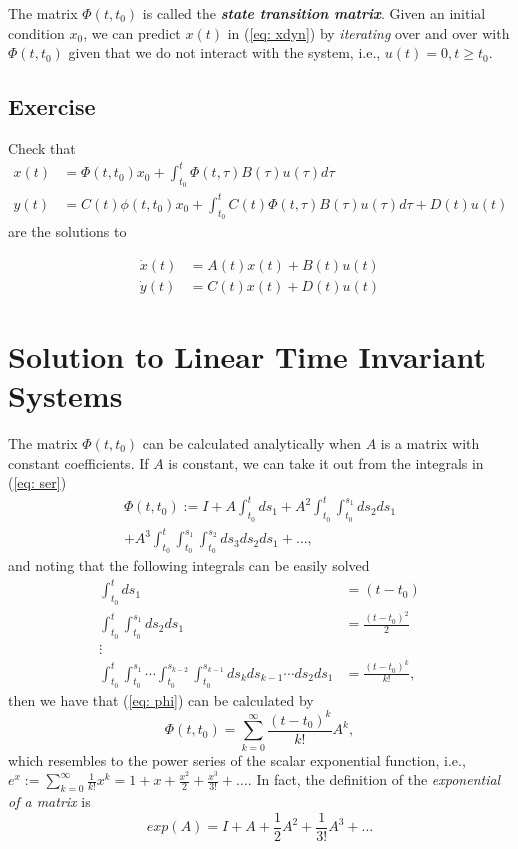 The matrix $\Phi(t,t_0)$ is called the \textbf{\emph{state transition matrix}}. Given an initial condition $x_0$, we can predict $x(t)$ in (\ref{eq: xdyn}) by \emph{iterating} over and over with $\Phi(t,t_0)$ given that we do not interact with the system, i.e., $u(t) = 0, t\geq t_0$.

\subsection{Exercise}
Check that 
\begin{align}
	x(t) &= \Phi(t,t_0)x_0 + \int_{t_0}^t \Phi(t,\tau)B(\tau)u(\tau)d\tau \nonumber \\
	y(t) &= C(t)\phi(t,t_0)x_0 + \int_{t_0}^t C(t)\Phi(t,\tau)B(\tau)u(\tau)d\tau + D(t)u(t) \nonumber
\end{align}
are the solutions to

\begin{align}
	\dot x(t) &= A(t)x(t) + B(t)u(t)  \nonumber \\
	\dot y(t) &= C(t)x(t) + D(t)u(t)  \nonumber
\end{align}

\section{Solution to Linear Time Invariant Systems}

The matrix $\Phi(t,t_0)$ can be calculated analytically when $A$ is a matrix with constant coefficients. If $A$ is constant, we can take it out from the integrals in (\ref{eq: ser})
\begin{align}
	\Phi(t,t_0) := I + A \int_{t_0}^t ds_1 + A^2 \int_{t_0}^t \int_{t_0}^{s_1} ds_2ds_1 \nonumber \\ + A^3 \int_{t_0}^t \int_{t_0}^{s_1} \int_{t_0}^{s_2} ds_3ds_2ds_1 + \dots \label{eq: phi},
\end{align}
and noting that the following integrals can be easily solved
\begin{align}
	\int_{t_0}^t ds_1 &= (t-t_0) \nonumber \\
	\int_{t_0}^t\int_{t_0}^{s_1} ds_2ds_1 &= \frac{(t-t_0)^2}{2} \nonumber \\
	\vdots \nonumber \\
	\int_{t_0}^t\int_{t_0}^{s_1} \cdots \int_{t_0}^{s_{k-2}}\int_{t_0}^{s_{k-1}}ds_k ds_{k-1} \cdots ds_2ds_1 &= \frac{(t-t_0)^k}{k!}, \nonumber
\end{align}
then we have that (\ref{eq: phi}) can be calculated by
\begin{equation}
	\Phi(t,t_0) = \sum_{k=0}^{\infty} \frac{(t-t_0)^k}{k!}A^k,
\end{equation}
which resembles to the power series of the scalar exponential function, i.e., $e^x := \sum_{k=0}^{\infty}\frac{1}{k!}x^k = 1 + x + \frac{x^2}{2} + \frac{x^3}{3!} + \dots $. In fact, the definition of the \emph{exponential of a matrix} is
\begin{equation}
	exp(A) = I + A + \frac{1}{2} A^2 + \frac{1}{3!} A^3 + \dots
\end{equation}

